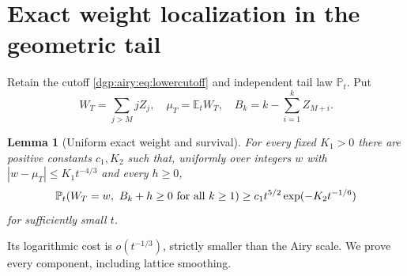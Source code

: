 \documentclass[11pt,letterpaper]{article}
\numberwithin{equation}{section}
\newtheorem{lemma}[theorem]{Lemma}
\theoremstyle{remark}\newtheorem{remark}[theorem]{Remark}
\newcommand{\PP}{\mathbb P}
\newcommand{\EE}{\mathbb E}
\begin{document}
\section{Exact weight localization in the geometric tail}\label{dgp:airy:sec:tail}
Retain the cutoff \eqref{dgp:airy:eq:lowercutoff} and independent tail law
$\PP_t$. Put
\[
 W_T=\sum_{j>M}jZ_j,\quad \mu_T=\EE_tW_T,\quad
 B_k=k-\sum_{i=1}^kZ_{M+i}.
\]
\begin{lemma}[Uniform exact weight and survival]\label{dgp:airy:lem:localization}
For every fixed $K_1>0$ there are positive constants $c_1,K_2$ such
that, uniformly over integers $w$ with
$|w-\mu_T|\leq K_1t^{-4/3}$ and every $h\geq0$,
\begin{equation}\label{dgp:airy:eq:taillocal}
 \PP_t(W_T=w,\ B_k+h\geq0\ \hbox{for all }k\geq1)
 \geq c_1t^{5/2}\exp(-K_2t^{-1/6})
\end{equation}
for sufficiently small $t$.
\end{lemma}
Its logarithmic cost is $o(t^{-1/3})$, strictly smaller than the Airy
scale. We prove every component, including lattice smoothing.
\end{document}
